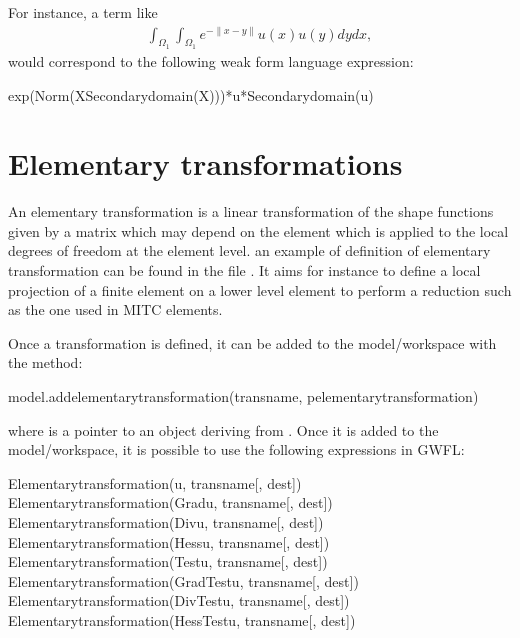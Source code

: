 \documentclass[a4paper,11pt,english]{sphinxmanual}
\begin{document}
For instance, a term like
\begin{equation*}
\begin{split}\int_{\Omega_1}\int_{\Omega_1}e^{-\|x-y\|}u(x)u(y)dydx,\end{split}
\end{equation*}
would correspond to the following weak form language expression:

\begin{sphinxVerbatim}[commandchars=\\\{\}]
exp(Norm(X\PYGZhy{}Secondary\PYGZus{}domain(X)))*u*Secondary\PYGZus{}domain(u)
\end{sphinxVerbatim}


\section{Elementary transformations}
\label{\detokenize{userdoc/gasm_high:elementary-transformations}}\label{\detokenize{userdoc/gasm_high:ud-gasm-high-elem-trans}}
An elementary transformation is a linear transformation of the shape
functions given by a matrix which may depend on the element which is applied
to the local degrees of freedom at the element level. an example of definition
of elementary transformation can be found in the file
. It aims for instance to define a local
projection of a finite element on a lower level element to perform a
reduction such as the one used in MITC elements.

Once a transformation is defined, it can be added to the model/workspace with
the method:

\begin{sphinxVerbatim}[commandchars=\\\{\}]
model.add\PYGZus{}elementary\PYGZus{}transformation(transname, pelementary\PYGZus{}transformation)
\end{sphinxVerbatim}

where  is a pointer to an object deriving from . Once it is added to the model/workspace, it is possible to use the following expressions in GWFL:

\begin{sphinxVerbatim}[commandchars=\\\{\}]
Elementary\PYGZus{}transformation(u, transname[, dest])
Elementary\PYGZus{}transformation(Grad\PYGZus{}u, transname[, dest])
Elementary\PYGZus{}transformation(Div\PYGZus{}u, transname[, dest])
Elementary\PYGZus{}transformation(Hess\PYGZus{}u, transname[, dest])
Elementary\PYGZus{}transformation(Test\PYGZus{}u, transname[, dest])
Elementary\PYGZus{}transformation(Grad\PYGZus{}Test\PYGZus{}u, transname[, dest])
Elementary\PYGZus{}transformation(Div\PYGZus{}Test\PYGZus{}u, transname[, dest])
Elementary\PYGZus{}transformation(Hess\PYGZus{}Test\PYGZus{}u, transname[, dest])
\end{sphinxVerbatim}
\end{document}

